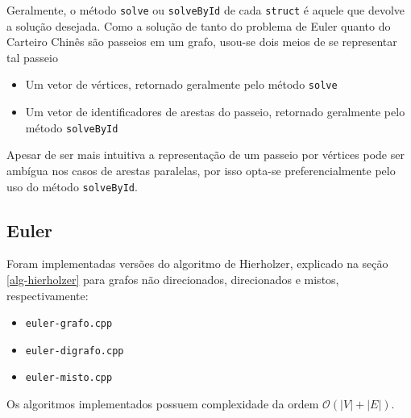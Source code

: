 Geralmente, o método \texttt{solve} ou \texttt{solveById} de cada \texttt{struct} é aquele que devolve a solução desejada.
Como a solução de tanto do problema de Euler quanto do Carteiro Chinês são passeios em um grafo, usou-se dois meios de se representar tal passeio

\begin{itemize}
    \item Um vetor de vértices, retornado geralmente pelo método \texttt{solve}
    \item Um vetor de identificadores de arestas do passeio, retornado geralmente pelo método \texttt{solveById}
\end{itemize}

Apesar de ser mais intuitiva a representação de um passeio por vértices pode ser ambígua nos casos de arestas paralelas, por isso opta-se preferencialmente pelo uso do método \texttt{solveById}.

\subsection{Euler}

Foram implementadas versões do algoritmo de Hierholzer, explicado na seção \ref{alg-hierholzer} para grafos não direcionados, direcionados e mistos, respectivamente:


\begin{itemize}
    \item \texttt{euler-grafo.cpp}
    \item \texttt{euler-digrafo.cpp}
    \item \texttt{euler-misto.cpp}
\end{itemize}

Os algoritmos implementados possuem complexidade da ordem $\mathcal{O}(|V| + |E|)$.

